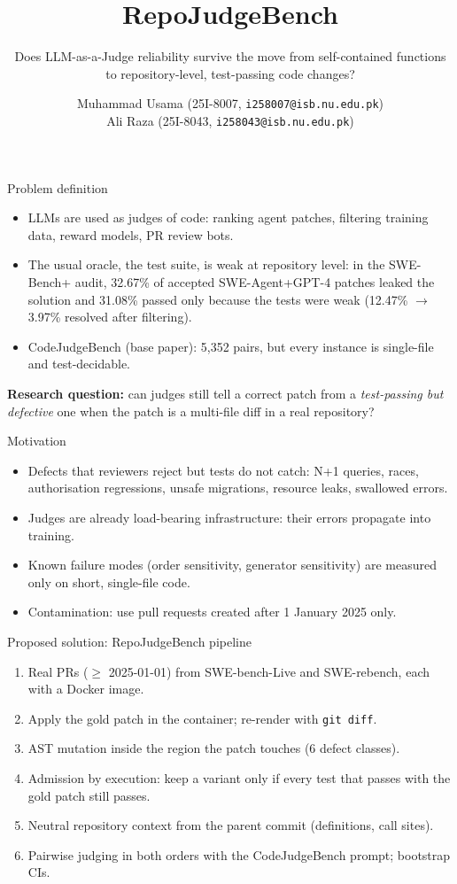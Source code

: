 \documentclass[10pt,aspectratio=169]{beamer}
\title{RepoJudgeBench}
\subtitle{Does LLM-as-a-Judge reliability survive the move from self-contained functions to repository-level, test-passing code changes?}
\author{Muhammad Usama (25I-8007, \texttt{i258007@isb.nu.edu.pk}) \\ Ali Raza (25I-8043, \texttt{i258043@isb.nu.edu.pk})}
\institute{Natural Language Processing --- Semester Research Project \\ National University of Computer and Emerging Sciences (FAST-NUCES), Islamabad}
\date{}
\newcommand{\CJB}{CodeJudgeBench}
\begin{document}
\maketitle

\begin{frame}{Problem definition}
\begin{itemize}
  \item LLMs are used as \alert{judges} of code: ranking agent patches, filtering training data, reward models, PR review bots.
  \item The usual oracle, the test suite, is weak at repository level: in the SWE-Bench+ audit, 32.67\% of accepted SWE-Agent+GPT-4 patches leaked the solution and 31.08\% passed only because the tests were weak (12.47\% $\rightarrow$ 3.97\% resolved after filtering).
  \item \CJB{} (base paper): 5{,}352 pairs, but every instance is \alert{single-file and test-decidable}.
\end{itemize}
\vspace{0.5em}
\textbf{Research question:} can judges still tell a correct patch from a \emph{test-passing but defective} one when the patch is a multi-file diff in a real repository?
\end{frame}

\begin{frame}{Motivation}
\begin{itemize}
  \item Defects that reviewers reject but tests do not catch: N+1 queries, races, authorisation regressions, unsafe migrations, resource leaks, swallowed errors.
  \item Judges are already load-bearing infrastructure: their errors propagate into training.
  \item Known failure modes (order sensitivity, generator sensitivity) are measured only on short, single-file code.
  \item Contamination: use pull requests created after 1 January 2025 only.
\end{itemize}
\end{frame}

\begin{frame}{Proposed solution: RepoJudgeBench pipeline}
\begin{enumerate}
  \item Real PRs ($\geq$ 2025-01-01) from SWE-bench-Live and SWE-rebench, each with a Docker image.
  \item Apply the gold patch in the container; re-render with \texttt{git diff}.
  \item \alert{AST mutation} inside the region the patch touches (6 defect classes).
  \item \alert{Admission by execution}: keep a variant only if every test that passes with the gold patch still passes.
  \item Neutral repository context from the parent commit (definitions, call sites).
  \item Pairwise judging in both orders with the \CJB{} prompt; bootstrap CIs.
\end{enumerate}
\end{frame}
\end{document}
